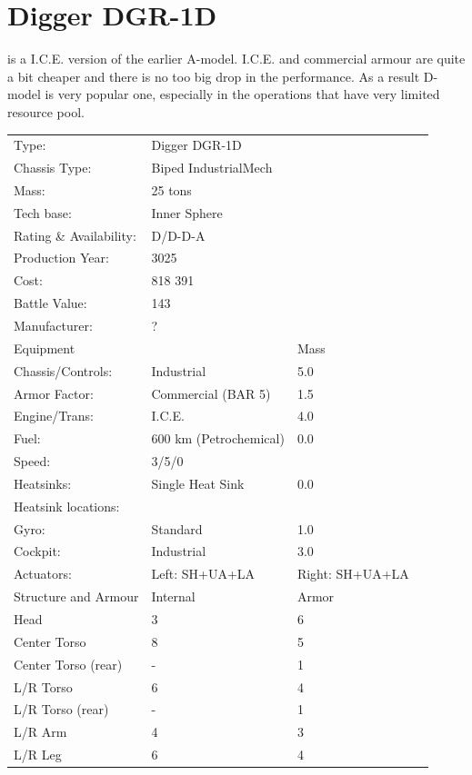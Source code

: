 \documentclass{tufte-book}
\begin{document}
\section{Digger DGR-1D}
 is a I.C.E. version of the earlier A-model. 
I.C.E. and commercial armour are quite a bit cheaper and there
is no too big drop in the performance. As a result D-model is 
very popular one, especially in the operations that have very limited 
resource pool.

\bigskip
\begin{minipage}{\textwidth}
\begin{center}
\begin{tabular}{llll}
\toprule
Type: & Digger DGR-1D & \\
Chassis Type: & Biped IndustrialMech & \\
Mass: & 25 tons & \\
Tech base: & Inner Sphere & \\
Rating \& Availability: & D/D-D-A & \\
Production Year: & 3025 & \\
Cost: & 818 391 & \\
Battle Value: & 143 & \\
Manufacturer: & ? & \\
Equipment & & Mass \\
\quad Chassis/Controls: & Industrial & 5.0 \\
\quad Armor Factor: & Commercial (BAR 5) & 1.5 \\
\quad Engine/Trans: & I.C.E. & 4.0 \\
\quad Fuel: & 600 km (Petrochemical) & 0.0 \\
\quad Speed: & \multicolumn{2}{l}{3/5/0} \\
\quad Heatsinks: & Single Heat Sink & 0.0 \\
\quad Heatsink locations: &  & \\
\quad Gyro: & Standard & 1.0 \\
\quad Cockpit: & Industrial & 3.0 \\
\quad Actuators: & Left: SH+UA+LA & Right: SH+UA+LA \\
Structure and Armour & Internal & Armor \\
\quad Head & 3 & 6 \\
\quad Center Torso & 8 & 5 \\
\quad Center Torso (rear) & - & 1 \\
\quad L/R Torso & 6 & 4 \\
\quad L/R Torso (rear) & - & 1 \\
\quad L/R Arm & 4 & 3 \\
\quad L/R Leg & 6 & 4 \\


\end{tabular}
\end{center}
\end{minipage}
\end{document}
